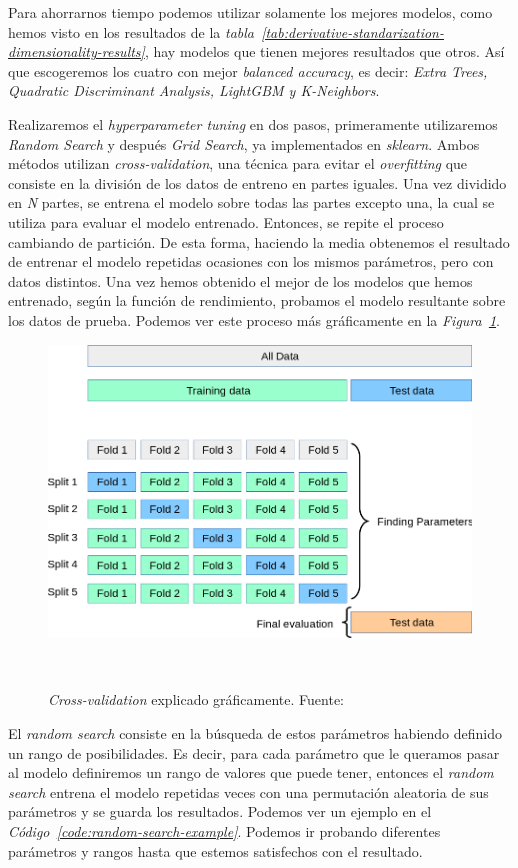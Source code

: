 Para ahorrarnos tiempo podemos utilizar solamente los mejores modelos, como hemos visto en los resultados de la \textit{tabla\ \ref{tab:derivative-standarization-dimensionality-results}}, hay modelos que tienen mejores resultados que otros. Así que escogeremos los cuatro con mejor \textit{balanced accuracy}, es decir: \textit{Extra Trees, Quadratic Discriminant Analysis, LightGBM y K-Neighbors}.

Realizaremos el \textit{hyperparameter tuning} en dos pasos, primeramente utilizaremos \textit{Random Search} y después \textit{Grid Search}, ya implementados en \textit{sklearn}.
Ambos métodos utilizan \textit{cross-validation}, una técnica para evitar el \textit{overfitting} que consiste en la división de los datos de entreno en partes iguales.
Una vez dividido en \textit{N} partes, se entrena el modelo sobre todas las partes excepto una, la cual se utiliza para evaluar el modelo entrenado. Entonces, se repite el 
proceso cambiando de partición. De esta forma, haciendo la media obtenemos el resultado de entrenar el modelo repetidas ocasiones con los mismos parámetros, pero con datos 
distintos. Una vez hemos obtenido el mejor de los modelos que hemos entrenado, según la función de rendimiento, probamos el modelo resultante sobre los datos de prueba.
Podemos ver este proceso más gráficamente en la \textit{Figura\ \ref{fig:cross-validation}}.

\begin{figure}[!h]
    \centering
    \includegraphics[width=0.7\linewidth]{media/images/cross-validation.png}
    \caption{\textit{Cross-validation} explicado gráficamente. Fuente:\ \cite{31Crossv20:online}}\ \label{fig:cross-validation}
\end{figure}


El \textit{random search} consiste en la búsqueda de estos parámetros habiendo definido un rango de posibilidades. Es decir, para cada parámetro que le queramos
pasar al modelo definiremos un rango de valores que puede tener, entonces el \textit{random search} entrena el modelo repetidas veces con una permutación aleatoria de sus 
parámetros y se guarda los resultados. Podemos ver un ejemplo en el \textit{Código\ \ref{code:random-search-example}}.
Podemos ir probando diferentes parámetros y rangos hasta que estemos satisfechos con el resultado.


